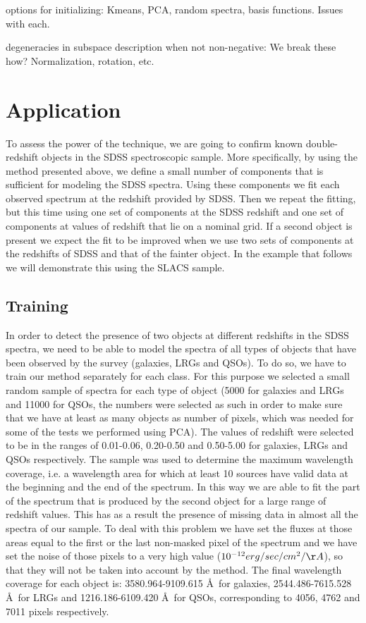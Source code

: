 \documentclass[12pt]{article}
\begin{document}
options for initializing: Kmeans, PCA, random spectra, basis functions.  Issues with each.

degeneracies in subspace description when not non-negative:  We break these how?  Normalization, rotation, etc.

\section{Application}

To assess the power of the technique, we are going to confirm known double-redshift objects in the SDSS spectroscopic sample. More specifically, by using the method presented above, we define a small number of components that is sufficient for modeling the SDSS spectra. Using these components we fit each observed spectrum at the redshift provided by SDSS. Then we repeat the fitting, but this time using one set of components at the SDSS redshift and one set of components at values of redshift that lie on a nominal grid. If a second object is present we expect the fit to be improved when we use two sets of components at the redshifts of SDSS and that of the fainter object. In the example that follows we will demonstrate this using the SLACS sample.

\subsection{Training}

In order to detect the presence of two objects at different redshifts in the SDSS spectra, we need to be able to model the spectra of all types of objects that have been observed by the survey (galaxies, LRGs and QSOs). To do so, we have to train our method separately for each class. For this purpose we selected a small random sample of spectra for each type of object (5000 for galaxies and LRGs and 11000 for QSOs, the numbers were selected as such in order to make sure that we have at least as many objects as number of pixels, which was needed for some of the tests we performed using PCA). The values of redshift were selected to be in the ranges of  0.01-0.06, 0.20-0.50 and 0.50-5.00 for galaxies, LRGs and QSOs respectively. The sample was used to determine the maximum wavelength coverage, i.e. a wavelength area for which at least 10 sources have valid data at the beginning and the end of the spectrum. In this way we are able to fit the part of the spectrum that is produced by the second object for a large range of redshift values. This has as a result the presence of missing data in almost all the spectra of our sample. To deal with this problem we have set the fluxes at those areas equal to the first or the last non-masked pixel of the spectrum and we have set the noise of those pixels to a very high value ($10^{-12} erg/sec/cm^2/\AA$), so that they will not be taken into account by the method. The final wavelength coverage for each object is: 3580.964-9109.615 \AA\ for galaxies, 2544.486-7615.528 \AA\ for LRGs and 1216.186-6109.420 \AA\ for QSOs, corresponding to 4056, 4762 and 7011 pixels respectively.
\end{document}
